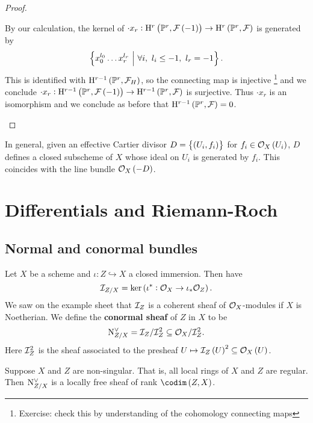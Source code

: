 \begin{proof}
\begin{itemize}
\begin{itemize}
$$$$
By our calculation, the kernel of $ \cdot x_r : \H^r\br{\PP^r, \FFF\br{-1}} \to \H^r\br{\PP^r, \FFF} $ is generated by
$$ \cbr{x_0^{l_0} \dots x_r^{l_r} \st \forall i, \ l_i \le -1, \ l_r = -1}. $$
This is identified with $ \H^{r - 1}\br{\PP^r, \FFF_H} $, so the connecting map is injective \footnote{Exercise: check this by understanding of the \Cech cohomology connecting maps} and we conclude $ \cdot x_r : \H^{r - 1}\br{\PP^r, \FFF\br{-1}} \to \H^{r - 1}\br{\PP^r, \FFF} $ is surjective. Thus $ \cdot x_r $ is an isomorphism and we conclude as before that $ \H^{r - 1}\br{\PP^r, \FFF} = 0 $.
\end{itemize}
\end{itemize}
\end{proof}

\begin{remark*}
In general, given an effective Cartier divisor $ D = \cbr{\br{U_i, f_i}} $ for $ f_i \in \OOO_X\br{U_i} $, $ D $ defines a closed subscheme of $ X $ whose ideal on $ U_i $ is generated by $ f_i $. This coincides with the line bundle $ \OOO_X\br{-D} $.
\end{remark*}

\pagebreak

\section{Differentials and Riemann-Roch}

\subsection{Normal and conormal bundles}

Let $ X $ be a scheme and $ \iota : Z \hookrightarrow X $ a closed immersion. Then have
$$ \III_{Z / X} = \ker \br{\iota^* : \OOO_X \to \iota_*\OOO_Z}. $$
We saw on the example sheet that $ \mathcal{I}_Z $ is a coherent sheaf of $ \mathcal{O}_X $-modules if $ X $ is Noetherian. We define the \textbf{conormal sheaf} of $ Z $ in $ X $ to be
$$ \mathrm{N}_{Z / X}^\vee = \mathcal{I}_Z / \mathcal{I}_Z^2 \subseteq \mathcal{O}_X / \mathcal{I}_Z^2. $$
Here $ \mathcal{I}_Z^2 $ is the sheaf associated to the presheaf $ U \mapsto \III_Z\br{U}^2 \subseteq \OOO_X\br{U} $.

\begin{fact*}
Suppose $ X $ and $ Z $ are non-singular. That is, all local rings of $ X $ and $ Z $ are regular. Then $ \mathrm{N}_{Z / X}^\vee $ is a locally free sheaf of rank $ \codim\br{Z, X} $.
\end{fact*}


